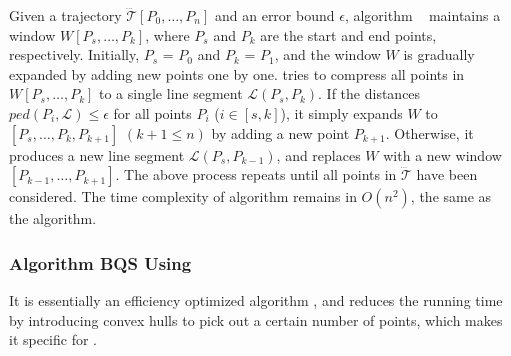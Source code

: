 Given a trajectory $\dddot{\mathcal{T}}[P_0, \ldots, P_n]$ and an error bound $\epsilon$, algorithm \opwa~\cite{Meratnia:Spatiotemporal} maintains a window $W[P_s, \ldots, P_k]$, where $P_s$ and $P_k$ are the start and end points, respectively. Initially, $P_s$ = $P_0$ and $P_k$ = $P_1$, and the window $W$ is gradually expanded by adding new points one by one. \opwa tries to compress all points in $W[P_s, \ldots, P_k]$ to a single line segment $\mathcal{L}(P_{s}, P_{k})$. If the distances $ped(P_i, {\mathcal{L}})\le \epsilon$ for all points $P_i$ ($i\in[s, k]$), it simply expands $W$ to $[P_s, \ldots, P_k, P_{k+1}]$ $(k+1\le n)$ by adding a new point $P_{k+1}$. Otherwise, it produces a new line segment $\mathcal{L}(P_{s}, P_{k-1})$, and replaces $W$ with a new window $[P_{k-1},\ldots,P_{k+1}]$. The above process repeats until all points in $\dddot{\mathcal{T}}$ have been considered.
%
%
The time complexity of algorithm \opwa remains in $O(n^2)$, the same as the \dpa algorithm.


\subsubsection{Algorithm BQS Using \ped \cite{Liu:BQS}}
It is essentially an efficiency optimized \opwa algorithm \cite{Meratnia:Spatiotemporal}, and reduces the running time by introducing convex hulls to pick out a certain number of points, which makes it specific for \ped.

